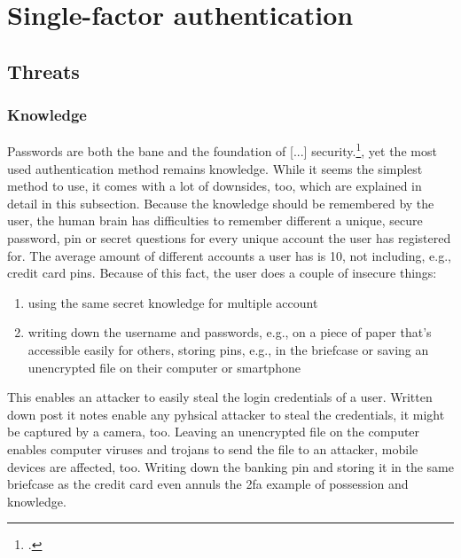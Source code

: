 \chapter{Single-factor authentication}


\section{Threats}
\label{sec:one-factor-threats}

\subsection{Knowledge}

\frqq Passwords are both the bane and the foundation of [...] security.\flqq{}\footcite[206]{517355}, yet the most used authentication method remains knowledge. While it seems the simplest method to use, it comes with a lot of downsides, too, which are explained in detail in this subsection. Because the knowledge should be remembered by the user, the human brain has difficulties to remember different a unique, secure password, \gls{pin} or secret questions for every unique account the user has registered for. The average amount of different accounts a user has is 10, not including, e.g., credit card \glspl{pin}. Because of this fact, the user does a couple of insecure things:

\begin{enumerate}[label=(\alph*)]
	\item using the same secret knowledge for multiple account
	\item writing down the username and passwords, e.g., on a piece of paper that's accessible easily for others, storing \glspl{pin}, e.g., in the briefcase or saving an unencrypted file on their computer or smartphone
\end{enumerate}

This enables an attacker to easily steal the login credentials of a user. Written down post it notes enable any pyhsical attacker to steal the credentials, it might be captured by a camera, too. Leaving an unencrypted file on the computer enables computer viruses and trojans to send the file to an attacker, mobile devices are affected, too. Writing down the banking \gls{pin} and storing it in the same briefcase as the credit card even annuls the \gls{2fa} example of possession and knowledge.

